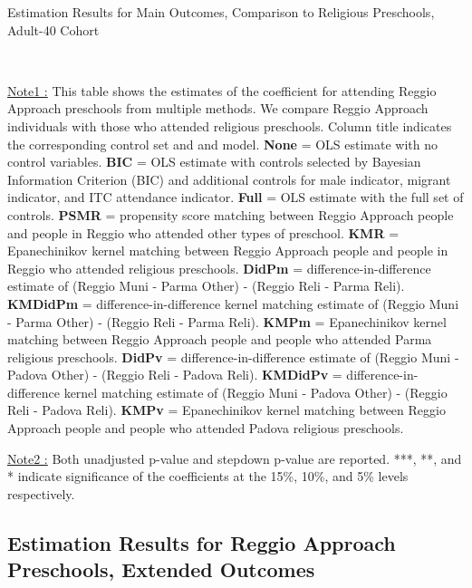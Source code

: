 \begin{table}[H] \caption{Estimation Results for Main Outcomes, Comparison to Religious Preschools, Adult-40 Cohort} \label{ols-M-adult40-reg-reli}
\scalebox{0.59}{}
\vspace{1ex} \\
\footnotesize\raggedright{\underline{Note1 :} This table shows the estimates of the coefficient for attending Reggio Approach preschools from multiple methods. We compare Reggio Approach individuals with those who attended religious preschools. Column title indicates the corresponding control set and and model. \textbf{None} = OLS estimate with no control variables. \textbf{BIC} = OLS estimate with controls selected by Bayesian Information Criterion (BIC) and additional controls for male indicator, migrant indicator, and ITC attendance indicator. \textbf{Full} = OLS estimate with the full set of controls. \textbf{PSMR} =  propensity score matching between Reggio Approach people and people in Reggio who attended other types of preschool. \textbf{KMR} = Epanechinikov kernel matching between Reggio Approach people and people in Reggio who attended religious preschools. \textbf{DidPm} = difference-in-difference estimate of (Reggio Muni - Parma Other) - (Reggio Reli - Parma Reli). \textbf{KMDidPm} = difference-in-difference kernel matching estimate of (Reggio Muni - Parma Other) - (Reggio Reli - Parma Reli). \textbf{KMPm} = Epanechinikov kernel matching between Reggio Approach people and people who attended Parma religious preschools. \textbf{DidPv} = difference-in-difference estimate of (Reggio Muni - Padova Other) - (Reggio Reli - Padova Reli). \textbf{KMDidPv} = difference-in-difference kernel matching estimate of (Reggio Muni - Padova Other) - (Reggio Reli - Padova Reli).  \textbf{KMPv} = Epanechinikov kernel matching between Reggio Approach people and people who attended Padova religious preschools.}

\footnotesize\raggedright{\underline{Note2 :} Both unadjusted p-value and stepdown p-value are reported. ***, **, and * indicate significance of the coefficients at the 15\%, 10\%, and 5\% levels respectively.}

\end{table}



\subsection{Estimation Results for Reggio Approach Preschools, Extended Outcomes}  \label{appsec:extended-outcome}
